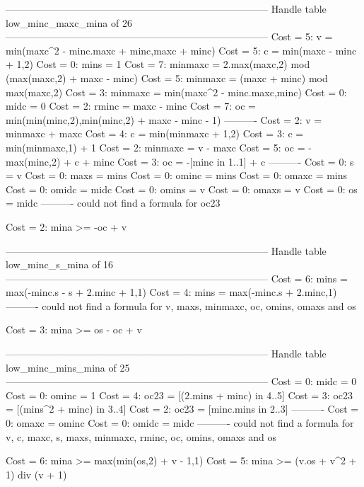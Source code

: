 --------------------------------------------------------------------------------
Handle table low_minc_maxc_mina of 26
--------------------------------------------------------------------------------
Cost =  5:  v       = min(maxc^2 - minc.maxc + minc,maxc + minc)
Cost =  5:  c       = min(maxc - minc + 1,2)
Cost =  0:  mins    = 1
Cost =  7:  minmaxc = 2.max(maxc,2) mod (max(maxc,2) + maxc - minc)
Cost =  5:  minmaxc = (maxc + minc) mod max(maxc,2)
Cost =  3:  minmaxc = min(maxc^2 - minc.maxc,minc)
Cost =  0:  midc    = 0
Cost =  2:  rminc   = maxc - minc
Cost =  7:  oc      = min(min(minc,2),min(minc,2) + maxc - minc - 1)
----------
Cost =  2:  v       = minmaxc + maxc
Cost =  4:  c       = min(minmaxc + 1,2)
Cost =  3:  c       = min(minmaxc,1) + 1
Cost =  2:  minmaxc = v - maxc
Cost =  5:  oc      = -max(minc,2) + c + minc
Cost =  3:  oc      = -[minc in 1..1] + c
----------
Cost =  0:  s       = v
Cost =  0:  maxs    = mins
Cost =  0:  ominc   = mins
Cost =  0:  omaxc   = mins
Cost =  0:  omidc   = midc
Cost =  0:  omins   = v
Cost =  0:  omaxs   = v
Cost =  0:  os      = midc
----------
could not find a formula for oc23

Cost =  2:  mina >= -oc + v

--------------------------------------------------------------------------------
Handle table low_minc_s_mina of 16
--------------------------------------------------------------------------------
Cost =  6:  mins    = max(-minc.s - s + 2.minc + 1,1)
Cost =  4:  mins    = max(-minc.s + 2.minc,1)
----------
could not find a formula for v, maxs, minmaxc, oc, omins, omaxs and os

Cost =  3:  mina >= os - oc + v

--------------------------------------------------------------------------------
Handle table low_minc_mins_mina of 25
--------------------------------------------------------------------------------
Cost =  0:  midc    = 0
Cost =  0:  ominc   = 1
Cost =  4:  oc23    = [(2.mins + minc) in 4..5]
Cost =  3:  oc23    = [(mins^2 + minc) in 3..4]
Cost =  2:  oc23    = [minc.mins in 2..3]
----------
Cost =  0:  omaxc   = ominc
Cost =  0:  omidc   = midc
----------
could not find a formula for v, c, maxc, s, maxs, minmaxc, rminc, oc, omins, omaxs and os

Cost =  6:  mina >= max(min(os,2) + v - 1,1)
Cost =  5:  mina >= (v.os + v^2 + 1) div (v + 1)

